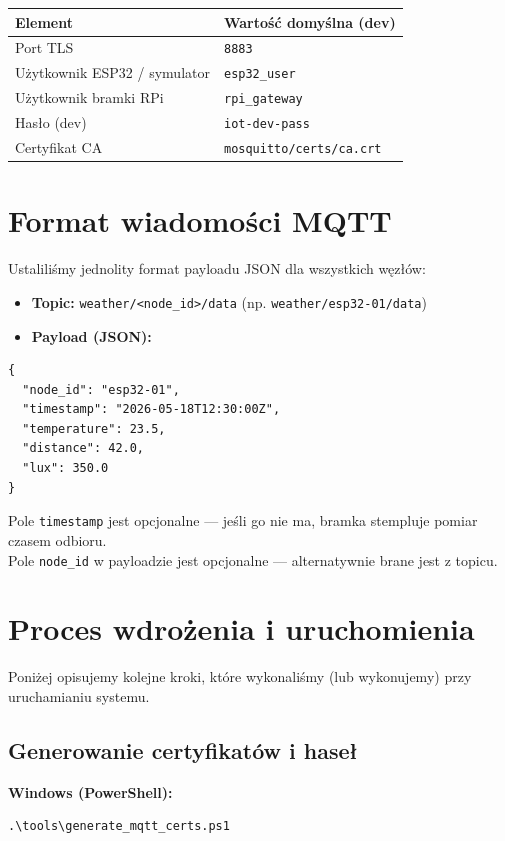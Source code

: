 \documentclass[12pt, a4paper]{article}
\begin{document}
\begin{table}[htbp]
    \centering
    \renewcommand{\arraystretch}{1.3}
    \begin{tabularx}{\textwidth}{@{} l X @{}}
        \toprule
        \textbf{Element} & \textbf{Wartość domyślna (dev)} \\
        \midrule
        Port TLS & \texttt{8883} \\
        Użytkownik ESP32 / symulator & \texttt{esp32\_user} \\
        Użytkownik bramki RPi & \texttt{rpi\_gateway} \\
        Hasło (dev) & \texttt{iot-dev-pass} \\
        Certyfikat CA & \texttt{mosquitto/certs/ca.crt} \\
        \bottomrule
    \end{tabularx}
\end{table}

\section{Format wiadomości MQTT}
Ustaliliśmy jednolity format payloadu JSON dla wszystkich węzłów:
\begin{itemize}
    \item \textbf{Topic:} \texttt{weather/<node\_id>/data} (np. \texttt{weather/esp32-01/data})
    \item \textbf{Payload (JSON):}
\end{itemize}

\begin{lstlisting}
{
  "node_id": "esp32-01",
  "timestamp": "2026-05-18T12:30:00Z",
  "temperature": 23.5,
  "distance": 42.0,
  "lux": 350.0
}
\end{lstlisting}

Pole \texttt{timestamp} jest opcjonalne — jeśli go nie ma, bramka stempluje pomiar czasem odbioru.\\
Pole \texttt{node\_id} w payloadzie jest opcjonalne — alternatywnie brane jest z topicu.

\section{Proces wdrożenia i uruchomienia}
Poniżej opisujemy kolejne kroki, które wykonaliśmy (lub wykonujemy) przy uruchamianiu systemu.

\subsection{Generowanie certyfikatów i haseł}
\textbf{Windows (PowerShell):}
\begin{lstlisting}
.\tools\generate_mqtt_certs.ps1
\end{lstlisting}
\end{document}

